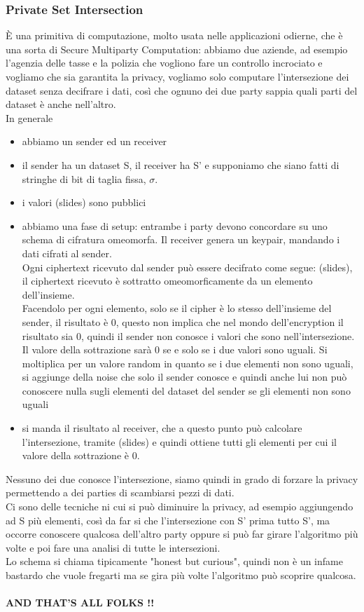 \documentclass[12pt, oneside]{extbook} %
\begin{document}
\subsubsection{Private Set Intersection}
È una primitiva di computazione, molto usata nelle applicazioni odierne, che è una sorta di Secure Multiparty Computation: abbiamo due aziende, ad esempio l'agenzia delle tasse e la polizia che vogliono fare un controllo incrociato e vogliamo che sia garantita la privacy, vogliamo solo computare l'intersezione dei dataset senza decifrare i dati, così che ognuno dei due party sappia quali parti del dataset è anche nell'altro.\\In generale
\begin{itemize}
	\item abbiamo un sender ed un receiver
	\item il sender ha un dataset S, il receiver ha S' e supponiamo che siano fatti di stringhe di bit di taglia fissa, $\sigma$.
	\item i valori (slides) sono pubblici
	\item abbiamo una fase di setup: entrambe i party devono concordare su uno schema di cifratura omeomorfa. Il receiver genera un keypair, mandando i dati cifrati al sender.\\Ogni ciphertext ricevuto dal sender può essere decifrato come segue: (slides), il ciphertext ricevuto è sottratto omeomorficamente da un elemento dell'insieme.\\Facendolo per ogni elemento, solo se il cipher è lo stesso dell'insieme del sender, il risultato è 0, questo non implica che nel mondo dell'encryption il risultato sia 0, quindi il sender non conosce i valori che sono nell'intersezione. Il valore della sottrazione sarà 0 se e solo se i due valori sono uguali. Si moltiplica per un valore random in quanto se i due elementi non sono uguali, si aggiunge della noise che solo il sender conosce e quindi anche lui non può conoscere nulla sugli elementi del dataset del sender se gli elementi non sono uguali
	\item si manda il risultato al receiver, che a questo punto può calcolare l'intersezione, tramite (slides) e quindi ottiene tutti gli elementi per cui il valore della sottrazione è 0.
\end{itemize}
Nessuno dei due conosce l'intersezione, siamo quindi in grado di forzare la privacy permettendo a dei parties di scambiarsi pezzi di dati.\\Ci sono delle tecniche ni cui si può diminuire la privacy, ad esempio aggiungendo ad S più elementi, così da far si che l'intersezione con S' prima tutto S', ma occorre conoscere qualcosa dell'altro party oppure si può far girare l'algoritmo più volte e poi fare una analisi di tutte le intersezioni.\\Lo schema si chiama tipicamente "honest but curious", quindi non è un infame bastardo che vuole fregarti ma se gira più volte l'algoritmo può scoprire qualcosa.\\\\
\Huge
\textbf{\textsf{AND THAT'S ALL FOLKS !!}}
\end{document}
